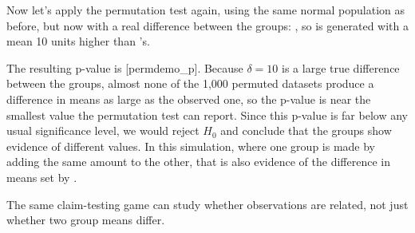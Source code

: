 \begin{example}
Now let's apply the permutation test again, using the same normal
population as before, but now with a real difference between the
groups: , so  is generated with a mean 10
units higher than 's.


The resulting p-value is
[permdemo_p]. Because $\delta = 10$ is a large
true difference between the groups, almost none of the 1,000 permuted
datasets produce a difference in means as large as the observed one,
so the p-value is near the smallest value the permutation test can
report. Since this p-value is far below any usual significance level,
we would reject $H_0$ and conclude that the groups show evidence of
different values. In this simulation, where one group is made by adding
the same amount to the other, that is also evidence of the difference
in means set by .
\end{example}


The same claim-testing game can study whether observations are related,
not just whether two group means differ.

